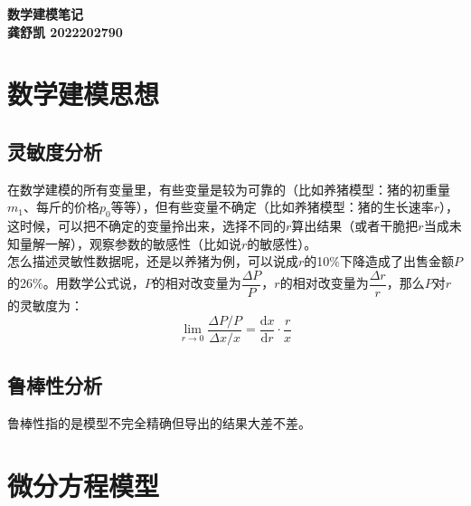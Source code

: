 \documentclass[11pt,a4paper]{article}
\begin{document}
\begin{center}
	\textbf{\Large 数学建模笔记}\\
	\vspace{5pt}
	\vspace{20pt}
	\textbf{龚舒凯 2022202790}\\
	\vspace{5pt}
\end{center}
\section{数学建模思想}
\subsection{灵敏度分析}
\indent\setlength{\parindent}{2em}在数学建模的所有变量里，有些变量是较为可靠的（比如养猪模型：猪的初重量$m_1$、每斤的价格$p_0$等等），但有些变量不确定（比如养猪模型：猪的生长速率$r$），这时候，可以把不确定的变量拎出来，选择不同的$r$算出结果（或者干脆把$r$当成未知量解一解），观察参数的敏感性（比如说$r$的敏感性）。\\
\indent\setlength{\parindent}{2em}怎么描述灵敏性数据呢，还是以养猪为例，可以说成$r$的10$\%$下降造成了出售金额$P$的26$\%$。用数学公式说，$P$的相对改变量为$\dfrac{\Delta P}{P}$，$r$的相对改变量为$\dfrac{\Delta r}{r}$，那么$P$对$r$的灵敏度为：
\begin{equation*}
\lim\limits_{r \to 0}\dfrac{\Delta P / P}{\Delta x/x}=\dfrac{\mathrm{d}x}{\mathrm{d}r}\cdot \dfrac{r}{x}
\end{equation*}
\subsection{鲁棒性分析}
\indent\setlength{\parindent}{2em}鲁棒性指的是模型不完全精确但导出的结果大差不差。

\section{微分方程模型}
\end{document}
